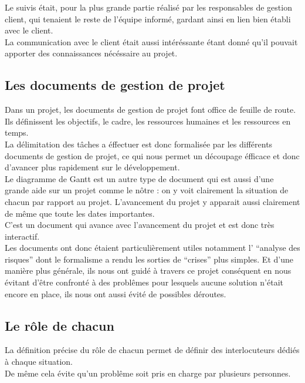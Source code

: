 Le suivis était, pour la plus grande partie réalisé par les responsables de gestion client, qui tenaient le reste de l'équipe informé, gardant ainsi en lien bien établi avec le client.\\

La communication avec le client était aussi intéréssante étant donné qu'il pouvait apporter des connaissances nécéssaire au projet.

\subsection{Les documents de gestion de projet}

Dans un projet, les documents de gestion de projet font office de feuille de route. Ils définissent les objectifs, le cadre, les ressources humaines et les ressources en temps.\\

La délimitation des tâches a éffectuer est donc formalisée par les différents documents de gestion de projet, ce qui nous permet un découpage éfficace et donc d'avancer plus rapidement sur le développement.\\

Le diagramme de Gantt est un autre type de document qui est aussi d'une grande aide sur un projet comme le nôtre : on y voit clairement la situation de chacun par rapport au projet. L'avancement du projet y apparait aussi clairement de même que toute les dates importantes.\\
C'est un document qui avance avec l'avancement du projet et est donc très interactif.\\

Les documents ont donc étaient particulièrement utiles notamment l' ``analyse des risques'' dont le formalisme a rendu les sorties de ``crises'' plus simples. 
Et d'une manière plus générale, ils nous ont guidé à travers ce projet conséquent en nous évitant d'être confronté à des problêmes pour lesquels aucune solution n'était encore en place, ils nous ont aussi évité de possibles déroutes.\\

\subsection{Le rôle de chacun}

La définition précise du rôle de chacun permet de définir des interlocuteurs dédiés à chaque situation.\\
De même cela évite qu'un problême soit pris en charge par plusieurs personnes.\\

